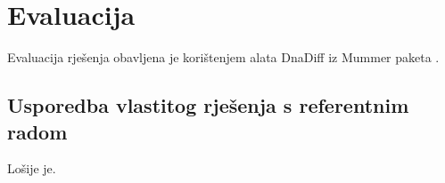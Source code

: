 \chapter{Evaluacija}


Evaluacija rješenja obavljena je korištenjem alata DnaDiff iz Mummer paketa \citep{kurtz2004versatile}.

\section{Usporedba vlastitog rješenja s referentnim radom}

Lošije je.

